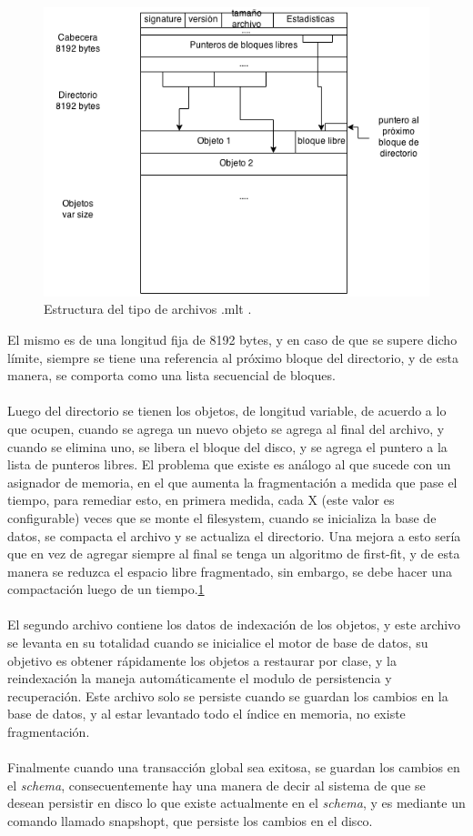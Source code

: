 \documentclass{melta}
\begin{document}
\begin{figure}
\centering
\includegraphics[scale=0.5]{meltafileformat}
\caption{Estructura del tipo de archivos .mlt .}
\label{melta:mltformat}
\end{figure}

El mismo es de una longitud fija de 8192 bytes, y en caso de que se supere dicho límite, siempre se tiene una referencia al próximo bloque del directorio, y de esta manera, se comporta como una lista secuencial de bloques. 
\\\\
Luego del directorio se tienen los objetos, de longitud variable, de acuerdo a lo que ocupen, cuando se agrega un nuevo objeto se agrega al final del archivo, y cuando se elimina uno, se libera el bloque del disco, y se agrega el puntero a la lista de punteros libres. El problema que existe es análogo al que sucede con un asignador de memoria, en el que aumenta la fragmentación a medida que pase el tiempo, para remediar esto, en primera medida, cada X (este valor es configurable) veces que se monte el filesystem, cuando se inicializa la base de datos, se compacta el archivo y se actualiza el directorio. Una mejora a esto sería que en vez de agregar siempre al final se tenga un algoritmo de first-fit, y de esta manera se reduzca el espacio libre fragmentado, sin embargo, se debe hacer una compactación luego de un tiempo.\ref{melta:mltformat}
\\\\
El segundo archivo contiene los datos de indexación de los objetos, y este archivo se levanta en su totalidad cuando se inicialice el motor de base de datos, su objetivo es obtener rápidamente los objetos a restaurar por clase, y la reindexación la maneja automáticamente el modulo de persistencia y recuperación. Este archivo solo se persiste cuando se guardan los cambios en la base de datos, y al estar levantado todo el índice en memoria, no existe fragmentación.
\\\\
Finalmente cuando una transacción global sea exitosa, se guardan los cambios en el \textit{schema}, consecuentemente hay una manera de decir al sistema de que se desean persistir en disco lo que existe actualmente en el \textit{schema}, y es mediante un comando llamado snapshopt, que persiste los cambios en el disco. 
\end{document}
